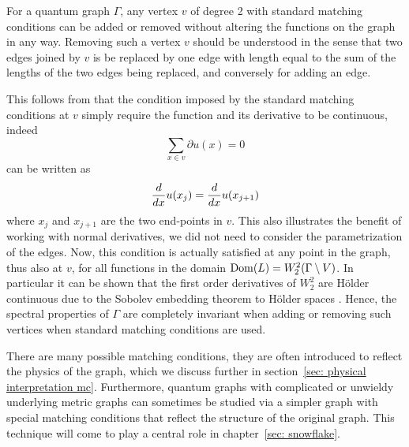 \begin{example}\label{ex: remove vertex smc}
  For a quantum graph $\Gamma$, any vertex $v$ of degree 2 with standard matching conditions can be added or removed without altering the functions on the graph in any way. Removing such a vertex $v$ should be understood in the sense that two edges joined by $v$ is be replaced by one edge with length equal to the sum of the lengths of the two edges being replaced, and conversely for adding an edge.

  This follows from that the condition imposed by the standard matching conditions at $v$ simply require the function and its derivative to be continuous, indeed
  \[ \sum_{x\in v} \partial u(x) = 0 \]
  can be written as
  \[ \frac{d}{dx} u(x_j) = \frac{d}{dx} u(x_{j+1}) \]
  where $x_j$ and $x_{j+1}$ are the two end-points in $v$. This also illustrates the benefit of working with normal derivatives, we did not need to consider the parametrization of the edges. Now, this condition is actually satisfied at any point in the graph, thus also at $v$, for all functions in the domain $\operatorname{Dom}(L) = W^2_2(\Gamma \setminus V)$. In particular it can be shown that the first order derivatives of $W^2_2$ are Hölder continuous due to the Sobolev embedding theorem to Hölder spaces \cite{adams sobolev spaces}. Hence, the spectral properties of $\Gamma$ are completely invariant when adding or removing such vertices when standard matching conditions are used.
\end{example}

There are many possible matching conditions, they are often introduced to reflect the physics of the graph, which we discuss further in section~\ref{sec: physical interpretation mc}. Furthermore, quantum graphs with complicated or unwieldy underlying metric graphs can sometimes be studied via a simpler graph with special matching conditions that reflect the structure of the original graph. This technique will come to play a central role in chapter~\ref{sec: snowflake}.
